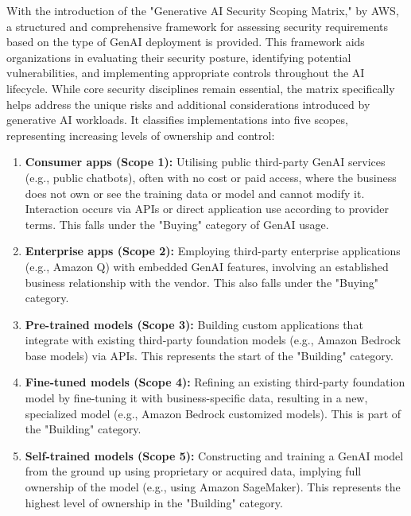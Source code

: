 With the introduction of the "Generative AI Security Scoping Matrix," by AWS, a structured and comprehensive framework for assessing security requirements based on the type of GenAI deployment is provided\cite{noauthor_securing_nodate}. This framework aids organizations in evaluating their security posture, identifying potential vulnerabilities, and implementing appropriate controls throughout the AI lifecycle\cite{noauthor_securing_nodate}. While core security disciplines remain essential, the matrix specifically helps address the unique risks and additional considerations introduced by generative AI workloads\cite{noauthor_securing_nodate}. It classifies implementations into five scopes, representing increasing levels of ownership and control\cite{noauthor_securing_2023}:

\begin{enumerate}
    \item \textbf{Consumer apps (Scope 1):} Utilising public third-party GenAI services (e.g., public chatbots), often with no cost or paid access, where the business does not own or see the training data or model and cannot modify it. Interaction occurs via APIs or direct application use according to provider terms\cite{noauthor_securing_2023}\cite{noauthor_securing_nodate}. This falls under the "Buying" category of GenAI usage\cite{noauthor_securing_nodate}.
    \item \textbf{Enterprise apps (Scope 2):} Employing third-party enterprise applications (e.g., Amazon Q) with embedded GenAI features, involving an established business relationship with the vendor\cite{noauthor_securing_2023}\cite{noauthor_securing_nodate}. This also falls under the "Buying" category\cite{noauthor_securing_nodate}.
    \item \textbf{Pre-trained models (Scope 3):} Building custom applications that integrate with existing third-party foundation models (e.g., Amazon Bedrock base models) via APIs\cite{noauthor_securing_2023}\cite{noauthor_securing_nodate}. This represents the start of the "Building" category\cite{noauthor_securing_nodate}.
    \item \textbf{Fine-tuned models (Scope 4):} Refining an existing third-party foundation model by fine-tuning it with business-specific data, resulting in a new, specialized model (e.g., Amazon Bedrock customized models)\cite{noauthor_securing_2023}\cite{noauthor_securing_nodate}. This is part of the "Building" category\cite{noauthor_securing_nodate}.
    \item \textbf{Self-trained models (Scope 5):} Constructing and training a GenAI model from the ground up using proprietary or acquired data, implying full ownership of the model (e.g., using Amazon SageMaker)\cite{noauthor_securing_2023}\cite{noauthor_securing_nodate}. This represents the highest level of ownership in the "Building" category\cite{noauthor_securing_nodate}.
\end{enumerate}

